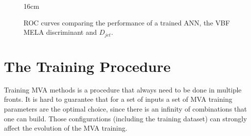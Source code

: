 \begin{figure}[hbtp]{16cm}
	\caption{ROC curves comparing the performance of a trained ANN, the VBF MELA discriminant and $D_{jet}$.}
	\centering
	\quad
	\quad
	\label{fig:scaling_training_effect}
\end{figure}

\section{The Training Procedure}
\label{subsec:training_procedure}
Training MVA methods is a procedure that always need to be done in multiple fronts. It is hard to guarantee that for a set of inputs a set of MVA training parameters are the optimal choice, since there is an infinity of combinations that one can build. Those configurations (including the training dataset) can strongly affect the evolution of the MVA training. 

